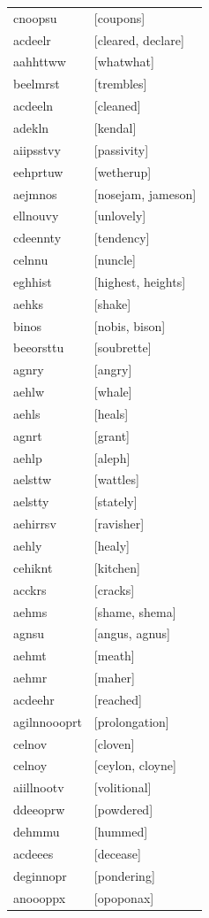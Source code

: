 \documentclass{article}
\begin{document}
\begin{tabular}{ll}
cnoopsu & [coupons] \\
acdeelr & [cleared, declare] \\
aahhttww & [whatwhat] \\
beelmrst & [trembles] \\
acdeeln & [cleaned] \\
adekln & [kendal] \\
aiipsstvy & [passivity] \\
eehprtuw & [wetherup] \\
aejmnos & [nosejam, jameson] \\
ellnouvy & [unlovely] \\
cdeennty & [tendency] \\
celnnu & [nuncle] \\
eghhist & [highest, heights] \\
aehks & [shake] \\
binos & [nobis, bison] \\
beeorsttu & [soubrette] \\
agnry & [angry] \\
aehlw & [whale] \\
aehls & [heals] \\
agnrt & [grant] \\
aehlp & [aleph] \\
aelsttw & [wattles] \\
aelstty & [stately] \\
aehirrsv & [ravisher] \\
aehly & [healy] \\
cehiknt & [kitchen] \\
acckrs & [cracks] \\
aehms & [shame, shema] \\
agnsu & [angus, agnus] \\
aehmt & [meath] \\
aehmr & [maher] \\
acdeehr & [reached] \\
agilnnoooprt & [prolongation] \\
celnov & [cloven] \\
celnoy & [ceylon, cloyne] \\
aiillnootv & [volitional] \\
ddeeoprw & [powdered] \\
dehmmu & [hummed] \\
acdeees & [decease] \\
deginnopr & [pondering] \\
anoooppx & [opoponax] \\

\end{tabular}
\end{document}
